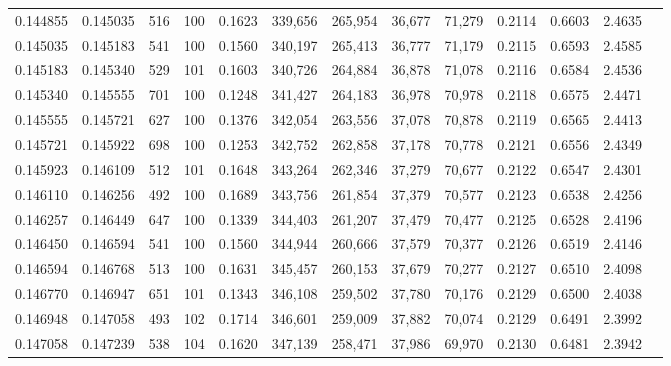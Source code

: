 \begin{tabular}{rrrrrrrrrrrrr}
0.144855 & 0.145035 &   516 & 100 &                                     0.1623 & 339,656 & 265,954 &  36,677 &  71,279 & 0.2114 & 0.6603 & 2.4635 \\
0.145035 & 0.145183 &   541 & 100 &                                     0.1560 & 340,197 & 265,413 &  36,777 &  71,179 & 0.2115 & 0.6593 & 2.4585 \\
0.145183 & 0.145340 &   529 & 101 &                                     0.1603 & 340,726 & 264,884 &  36,878 &  71,078 & 0.2116 & 0.6584 & 2.4536 \\
0.145340 & 0.145555 &   701 & 100 &                                     0.1248 & 341,427 & 264,183 &  36,978 &  70,978 & 0.2118 & 0.6575 & 2.4471 \\
0.145555 & 0.145721 &   627 & 100 &                                     0.1376 & 342,054 & 263,556 &  37,078 &  70,878 & 0.2119 & 0.6565 & 2.4413 \\
0.145721 & 0.145922 &   698 & 100 &                                     0.1253 & 342,752 & 262,858 &  37,178 &  70,778 & 0.2121 & 0.6556 & 2.4349 \\
0.145923 & 0.146109 &   512 & 101 &                                     0.1648 & 343,264 & 262,346 &  37,279 &  70,677 & 0.2122 & 0.6547 & 2.4301 \\
0.146110 & 0.146256 &   492 & 100 &                                     0.1689 & 343,756 & 261,854 &  37,379 &  70,577 & 0.2123 & 0.6538 & 2.4256 \\
0.146257 & 0.146449 &   647 & 100 &                                     0.1339 & 344,403 & 261,207 &  37,479 &  70,477 & 0.2125 & 0.6528 & 2.4196 \\
0.146450 & 0.146594 &   541 & 100 &                                     0.1560 & 344,944 & 260,666 &  37,579 &  70,377 & 0.2126 & 0.6519 & 2.4146 \\
0.146594 & 0.146768 &   513 & 100 &                                     0.1631 & 345,457 & 260,153 &  37,679 &  70,277 & 0.2127 & 0.6510 & 2.4098 \\
0.146770 & 0.146947 &   651 & 101 &                                     0.1343 & 346,108 & 259,502 &  37,780 &  70,176 & 0.2129 & 0.6500 & 2.4038 \\
0.146948 & 0.147058 &   493 & 102 &                                     0.1714 & 346,601 & 259,009 &  37,882 &  70,074 & 0.2129 & 0.6491 & 2.3992 \\
0.147058 & 0.147239 &   538 & 104 &                                     0.1620 & 347,139 & 258,471 &  37,986 &  69,970 & 0.2130 & 0.6481 & 2.3942 \\

\end{tabular}
